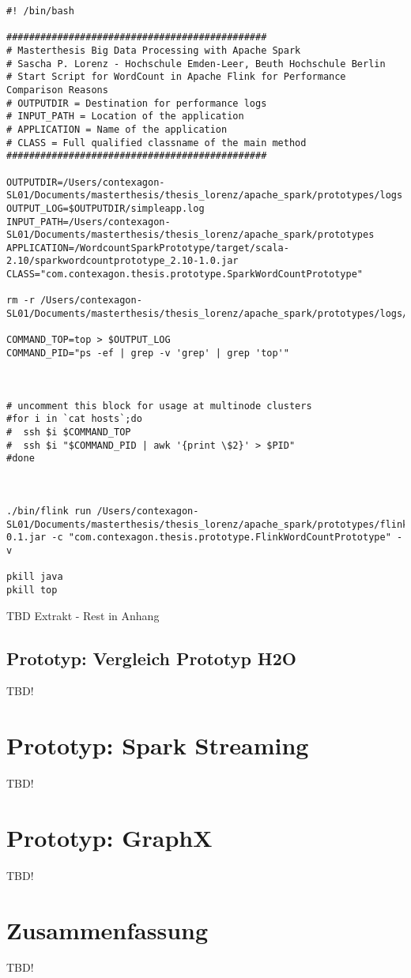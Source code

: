 \begin{lstlisting}[label=shellflink,caption=Shellscript zum Start des Flink WordCountPrototyp]
#! /bin/bash

##############################################
# Masterthesis Big Data Processing with Apache Spark
# Sascha P. Lorenz - Hochschule Emden-Leer, Beuth Hochschule Berlin
# Start Script for WordCount in Apache Flink for Performance Comparison Reasons	
# OUTPUTDIR = Destination for performance logs
# INPUT_PATH = Location of the application 
# APPLICATION = Name of the application
# CLASS = Full qualified classname of the main method
##############################################

OUTPUTDIR=/Users/contexagon-SL01/Documents/masterthesis/thesis_lorenz/apache_spark/prototypes/logs
OUTPUT_LOG=$OUTPUTDIR/simpleapp.log
INPUT_PATH=/Users/contexagon-SL01/Documents/masterthesis/thesis_lorenz/apache_spark/prototypes
APPLICATION=/WordcountSparkPrototype/target/scala-2.10/sparkwordcountprototype_2.10-1.0.jar
CLASS="com.contexagon.thesis.prototype.SparkWordCountPrototype"

rm -r /Users/contexagon-SL01/Documents/masterthesis/thesis_lorenz/apache_spark/prototypes/logs/flinkOutput.out

COMMAND_TOP=top > $OUTPUT_LOG
COMMAND_PID="ps -ef | grep -v 'grep' | grep 'top'"



# uncomment this block for usage at multinode clusters
#for i in `cat hosts`;do
#  ssh $i $COMMAND_TOP
#  ssh $i "$COMMAND_PID | awk '{print \$2}' > $PID"
#done



./bin/flink run /Users/contexagon-SL01/Documents/masterthesis/thesis_lorenz/apache_spark/prototypes/flink_tests/WordCountPrototypeFlink/target/WordCountFlinkPrototype-0.1.jar -c "com.contexagon.thesis.prototype.FlinkWordCountPrototype" -v

pkill java
pkill top
\end{lstlisting}

TBD Extrakt - Rest in Anhang

\subsection{Prototyp: Vergleich Prototyp H2O }
\label{section:vergleich h2o}

TBD!


\section{Prototyp: Spark Streaming }
\label{section:prototyp spark streaming}

TBD!



\section{Prototyp: GraphX}
\label{section:prototyp graphX}

TBD!




\section{Zusammenfassung}
\label{section:zusammen}



TBD!



